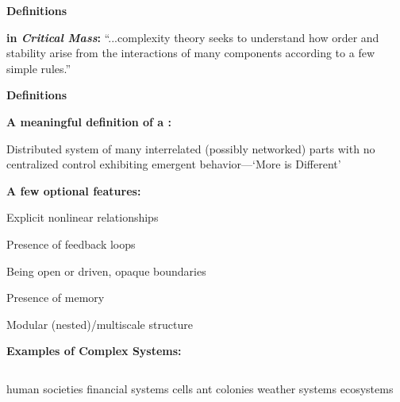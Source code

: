 \begin{frame}[plain]
  \textbf{Definitions}

  \textbf{ in \textit{Critical Mass}:}\cite{ball2004a}
    ``...complexity theory seeks to understand how order and 
    stability arise from the interactions of many components
    according to a few simple rules.''
  




  \textbf{Definitions}


  \textbf{A meaningful definition of a :}
    
    
      Distributed system of many interrelated (possibly networked) parts
      with no centralized control
      exhibiting 
      emergent behavior---`More is Different'\cite{anderson1972a}
        
  

  \textbf{A few optional features:}
    
    
      Explicit nonlinear relationships
    
      Presence of feedback loops
    
      Being open or driven, opaque boundaries
    
      Presence of memory
    
      Modular (nested)/multiscale structure
    
  



  \textbf{Examples of Complex Systems:}

  
    \begin{columns}[t] 
      \begin{column}{0.45\textwidth} 
        
         human societies 
         financial systems
         cells     
         ant colonies 
         weather systems 
         ecosystems     
        

\end{column}
\end{columns}
\end{frame}
